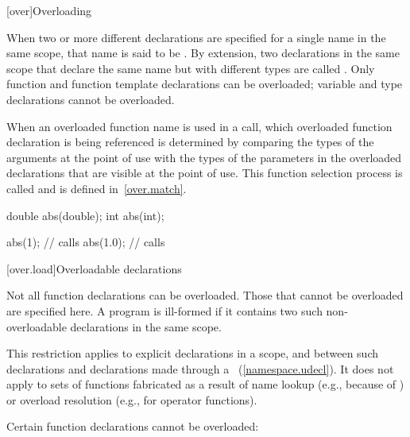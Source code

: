 [over]{Overloading}%


\pnum
{}%
%
%
When two or more different declarations are specified for a single name
in the same scope, that name is said to be
.
By extension, two declarations in the same scope that declare the same name
but with different types are called
.
Only function and function template
declarations can be overloaded; variable and type declarations
cannot be overloaded.

\pnum
When an overloaded function name is used in a call, which overloaded function
declaration is being referenced is determined by comparing the types
of the arguments at the point of use with the types of the parameters
in the overloaded declarations that are visible at the point of use.
This function selection process is called
and
is defined in~\ref{over.match}.
\begin{example}

%
\begin{codeblock}
double abs(double);
int abs(int);

abs(1);             // calls 
abs(1.0);           // calls 
\end{codeblock}
\end{example}

[over.load]{Overloadable declarations}
%

\pnum
{}%
Not all function declarations can be overloaded.
Those that cannot be
overloaded are specified here.
A program is ill-formed if it contains
two such non-overloadable declarations in the same scope.
\begin{note}
This restriction applies to explicit declarations in a scope, and between
such declarations and
declarations made through a
~(\ref{namespace.udecl}).
It does not apply to sets of functions fabricated as a result of
name lookup (e.g., because of
)
or overload resolution
(e.g., for operator functions).
\end{note}

\pnum
Certain function declarations cannot be overloaded:

